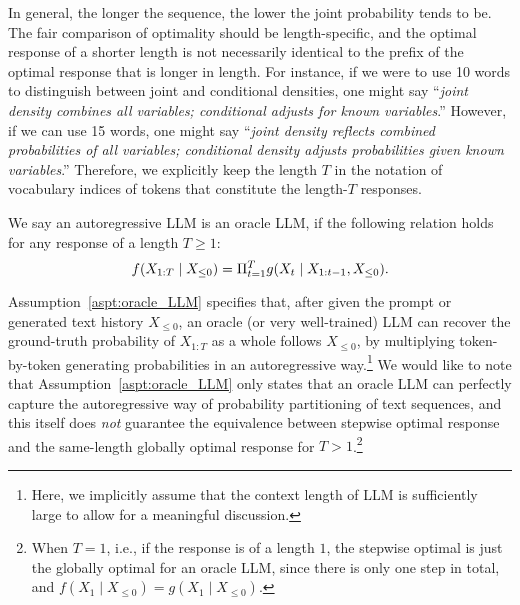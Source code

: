 In general, the longer the sequence, the lower the joint probability tends to be.
The fair comparison of optimality should be length-specific, and the optimal response of a shorter length is not necessarily identical to the prefix of the optimal response that is longer in length.
For instance, if we were to use 10 words to distinguish between joint and conditional densities, one might say ``\emph{joint density combines all variables; conditional adjusts for known variables}.''
However, if we can use 15 words, one might say ``\emph{joint density reflects combined probabilities of all variables; conditional density adjusts probabilities given known variables}.''
Therefore, we explicitly keep the length $T$ in the notation of vocabulary indices of tokens that constitute the length-$T$ responses.
\begin{assumption}\label{aspt:oracle_LLM}
    We say an autoregressive LLM is an oracle LLM, if the following relation holds for any response of a length $T \geq 1$:
    \begin{equation}
        \small
        f(X_{1:T} \mid X_{\leq 0}) = \Pi_{t = 1}^{T} g(X_{t} \mid X_{1:t-1}, X_{\leq 0}).
    \end{equation}
\end{assumption}
Assumption~\ref{aspt:oracle_LLM} specifies that, after given the prompt or generated text history $X_{\leq 0}$, an oracle (or very well-trained) LLM can recover the ground-truth probability of $X_{1:T}$ as a whole follows $X_{\leq 0}$, by multiplying token-by-token generating probabilities in an autoregressive way.\footnote{
    Here, we implicitly assume that the context length of LLM is sufficiently large to allow for a meaningful discussion.
}
We would like to note that Assumption~\ref{aspt:oracle_LLM} only states that an oracle LLM can perfectly capture the autoregressive way of probability partitioning of text sequences, and this itself does \emph{not} guarantee the equivalence between stepwise optimal response and the same-length globally optimal response for $T > 1$.\footnote{
    When $T = 1$, i.e., if the response is of a length $1$, the stepwise optimal is just the globally optimal for an oracle LLM, since there is only one step in total, and $f(X_1 \mid X_{\leq 0}) = g(X_1 \mid X_{\leq 0})$.
}

